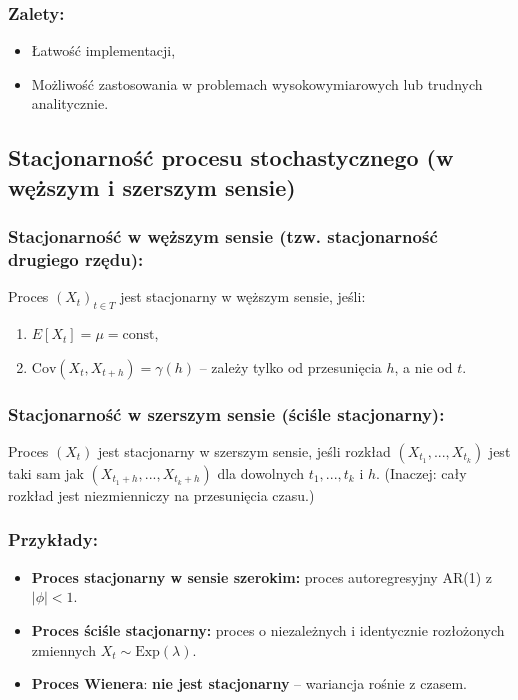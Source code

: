 \subsubsection*{Zalety:}
\begin{itemize}
    \item Łatwość implementacji,
    \item Możliwość zastosowania w problemach wysokowymiarowych lub trudnych analitycznie.
\end{itemize}

\subsection{Stacjonarność procesu stochastycznego (w węższym i szerszym sensie)}
\subsubsection*{Stacjonarność w węższym sensie (tzw. stacjonarność drugiego rzędu):}
Proces $(X_t)_{t \in T}$ jest stacjonarny w węższym sensie, jeśli:

\begin{enumerate}
    \item $E[X_t] = \mu = \text{const}$,
    \item $\text{Cov}(X_t, X_{t+h}) = \gamma(h)$ -- zależy tylko od przesunięcia $h$, a nie od $t$.
\end{enumerate}

\subsubsection*{Stacjonarność w szerszym sensie (ściśle stacjonarny):}
Proces $(X_t)$ jest stacjonarny w szerszym sensie, jeśli rozkład $(X_{t_1}, ..., X_{t_k})$ jest taki sam jak $(X_{t_1+h}, ..., X_{t_k+h})$ dla dowolnych $t_1,...,t_k$ i $h$.
(Inaczej: cały rozkład jest niezmienniczy na przesunięcia czasu.)

\subsubsection*{Przykłady:}

\begin{itemize}
    \item \textbf{Proces stacjonarny w sensie szerokim:} proces autoregresyjny AR(1) z $|\phi| < 1$.
    \item \textbf{Proces ściśle stacjonarny:} proces o niezależnych i identycznie rozłożonych zmiennych $X_t \sim \text{Exp}(\lambda)$.
    \item \textbf{Proces Wienera}: \textbf{nie jest stacjonarny} -- wariancja rośnie z czasem.
\end{itemize}

